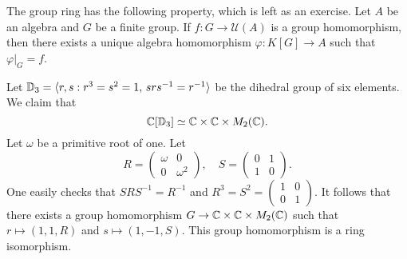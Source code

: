 The group ring has the following property, which is left as an exercise. 
Let $A$ be an algebra and
$G$ be a finite group. If $f\colon G\to\mathcal{U}(A)$ is a group homomorphism, 
then there exists a unique algebra homomorphism $\varphi\colon K[G]\to A$ such that
$\varphi|_G=f$. 

\begin{example}
	Let $\mathbb{D}_3=\langle r,s:r^3=s^2=1,\,srs^{-1}=r^{-1}\rangle$ be the dihedral
	group of six elements. We claim that 
	\[
	\mathbb{C}[\mathbb{D}_3]\simeq\mathbb{C}\times\mathbb{C}\times M_2(\mathbb{C}).
	\]
	Let $\omega$ be a primitive root of one. Let 
	\[
	R=\begin{pmatrix}
		\omega&0\\
		0&\omega^2	
	\end{pmatrix},
	\quad
	S=\begin{pmatrix}
		0&1\\
		1&0
	\end{pmatrix}.
 	\]
 	One easily checks that $SRS^{-1}=R^{-1}$ and $R^3=S^2=\begin{pmatrix}
		1&0\\
		0&1	
	\end{pmatrix}$. It follows that there exists a group homomorphism
	$G\to\mathbb{C}\times\mathbb{C}\times M_2(\mathbb{C})$ such that
	$r\mapsto (1,1,R)$ and $s\mapsto (1,-1,S)$. This group homomorphism
	is a ring isomorphism.  
\end{example}




 
